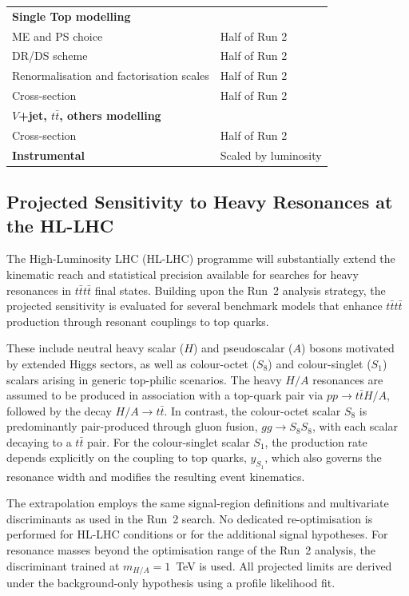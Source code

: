 \begin{table}[htbp]
\begin{tabular}{p{} p{}}
\multicolumn{2}{l}{\textbf{Single Top modelling}} \\
ME and PS choice & Half of Run 2 \\
DR/DS scheme & Half of Run 2 \\
Renormalisation and factorisation scales & Half of Run 2 \\
Cross-section & Half of Run 2 \\

\multicolumn{2}{l}{\textbf{\boldmath $V$+jet, $t\bar{t}$, others modelling}} \\
Cross-section & Half of Run 2 \\
\midrule

\textbf{Instrumental} & Scaled by luminosity \\
\bottomrule
\end{tabular}
\end{table}

\subsection{Projected Sensitivity to Heavy Resonances at the HL-LHC}
\label{sec:HL_signal_models}

The High-Luminosity LHC (HL-LHC) programme will substantially extend the kinematic reach and statistical precision available for searches for heavy resonances in $t\bar{t}t\bar{t}$ final states. 
Building upon the Run~2 analysis strategy, the projected sensitivity is evaluated for several benchmark models that enhance $t\bar{t}t\bar{t}$ production through resonant couplings to top quarks.

These include neutral heavy scalar ($H$) and pseudoscalar ($A$) bosons motivated by extended Higgs sectors, as well as colour-octet ($S_8$) and colour-singlet ($S_1$) scalars arising in generic top-philic scenarios. 
The heavy $H/A$ resonances are assumed to be produced in association with a top-quark pair via $pp \to t\bar{t}H/A$, followed by the decay $H/A \to t\bar{t}$. 
In contrast, the colour-octet scalar $S_8$ is predominantly pair-produced through gluon fusion, $gg \to S_8 S_8$, with each scalar decaying to a $t\bar{t}$ pair. 
For the colour-singlet scalar $S_1$, the production rate depends explicitly on the coupling to top quarks, $y_{S_1}$, which also governs the resonance width and modifies the resulting event kinematics.

The extrapolation employs the same signal-region definitions and multivariate discriminants as used in the Run~2 search. 
No dedicated re-optimisation is performed for HL-LHC conditions or for the additional signal hypotheses. 
For resonance masses beyond the optimisation range of the Run~2 analysis, the discriminant trained at $m_{H/A}=1$~TeV is used. 
All projected limits are derived under the background-only hypothesis using a profile likelihood fit.

